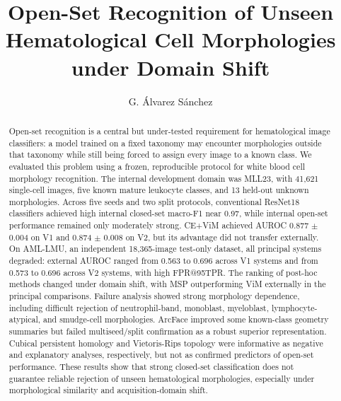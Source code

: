 \documentclass[11pt]{article}
\title{Open-Set Recognition of Unseen Hematological Cell Morphologies under Domain Shift}
\author{G. Álvarez Sánchez}
\date{}
\begin{document}
\maketitle

\begin{abstract}
Open-set recognition is a central but under-tested requirement for hematological image classifiers: a model trained on a fixed taxonomy may encounter morphologies outside that taxonomy while still being forced to assign every image to a known class. We evaluated this problem using a frozen, reproducible protocol for white blood cell morphology recognition. The internal development domain was MLL23, with 41,621 single-cell images, five known mature leukocyte classes, and 13 held-out unknown morphologies. Across five seeds and two split protocols, conventional ResNet18 classifiers achieved high internal closed-set macro-F1 near 0.97, while internal open-set performance remained only moderately strong. CE+ViM achieved AUROC 0.877 $\pm$ 0.004 on V1 and 0.874 $\pm$ 0.008 on V2, but its advantage did not transfer externally. On AML-LMU, an independent 18,365-image test-only dataset, all principal systems degraded: external AUROC ranged from 0.563 to 0.696 across V1 systems and from 0.573 to 0.696 across V2 systems, with high FPR@95TPR. The ranking of post-hoc methods changed under domain shift, with MSP outperforming ViM externally in the principal comparisons. Failure analysis showed strong morphology dependence, including difficult rejection of neutrophil-band, monoblast, myeloblast, lymphocyte-atypical, and smudge-cell morphologies. ArcFace improved some known-class geometry summaries but failed multiseed/split confirmation as a robust superior representation. Cubical persistent homology and Vietoris-Rips topology were informative as negative and explanatory analyses, respectively, but not as confirmed predictors of open-set performance. These results show that strong closed-set classification does not guarantee reliable rejection of unseen hematological morphologies, especially under morphological similarity and acquisition-domain shift.
\end{abstract}















\end{document}
